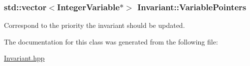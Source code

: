 \hypertarget{class_invariant_a86da68637f1714836eb31c302c01362b}{
\subsubsection[{Variable\-Pointers}]{\setlength{\rightskip}{0pt plus 5cm}std\-::vector$<${\bf Integer\-Variable}$\ast$$>$ Invariant\-::\-Variable\-Pointers\hspace{0.3cm}{\ttfamily [protected]}}}\label{class_invariant_a86da68637f1714836eb31c302c01362b}


Correspond to the priority the invariant should be updated. 



The documentation for this class was generated from the following file\-:\begin{DoxyCompactItemize}
\item 
\hyperlink{_invariant_8hpp}{Invariant.\-hpp}\end{DoxyCompactItemize}

